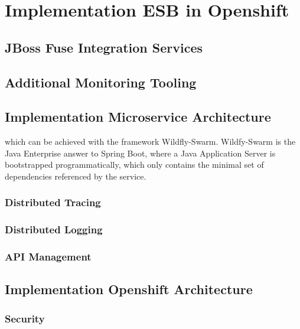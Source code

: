 \chapter{Implementation ESB in Openshift}
\label{cha:esbi}

\section{JBoss Fuse Integration Services}
\label{sec:esbi-fis}

\section{Additional Monitoring Tooling}
\label{sec:esbi-additional-tooling}

\section{Implementation Microservice Architecture}
\label{sec:esbi-impl-services}
 which can be achieved with the framework Wildfly-Swarm. Wildfy-Swarm is the Java Enterprise answer to Spring Boot, where a Java Application Server is bootstrapped programmatically, which only contains the minimal set of dependencies referenced by the service. 

\subsection{Distributed Tracing}
\label{sec:esbi-impl-tracing}

\subsection{Distributed Logging}
\label{sec:esbi-impl-logging}

\subsection{API Management}
\label{sec:esboc-impl-api}

\section{Implementation Openshift Architecture}
\label{sec:esbi-impl-oc}

\subsection{Security}
\label{sec:esboc-impl-security}
